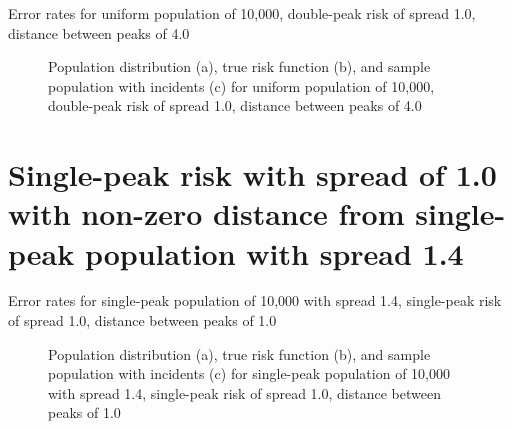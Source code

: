 
\begin{table}[H]
    
    \caption[]{Error rates for uniform population of 10,000, double-peak risk of \gls{spread} 1.0, distance between peaks of 4.0}
    \label{tab:mean_error_rates:unif_100_1_2h_4}
\end{table}

\begin{figure}[H]
    
    \caption[]{Population distribution (a), true risk function (b), and sample population with incidents (c) for uniform population of 10,000, double-peak risk of \gls{spread} 1.0, distance between peaks of 4.0}
    \label{fig:distributions:unif_100_1_2h_4}    
\end{figure}

\section{Single-peak risk with spread of 1.0 with non-zero distance from single-peak population with spread 1.4}
\label{sec:app:results_p1.4_100_1_1h_X}


\begin{table}[H]
    
    \caption[]{Error rates for single-peak population of 10,000 with \gls{spread} 1.4, single-peak risk of \gls{spread} 1.0, distance between peaks of 1.0}
    \label{tab:mean_error_rates:p1.4_100_1_1h_1s}
\end{table}

\begin{figure}[H]
    
    \caption[]{Population distribution (a), true risk function (b), and sample population with incidents (c) for single-peak population of 10,000 with \gls{spread} 1.4, single-peak risk of \gls{spread} 1.0, distance between peaks of 1.0}
    \label{fig:distributions:p1.4_100_1_1h_1s}    
\end{figure}


